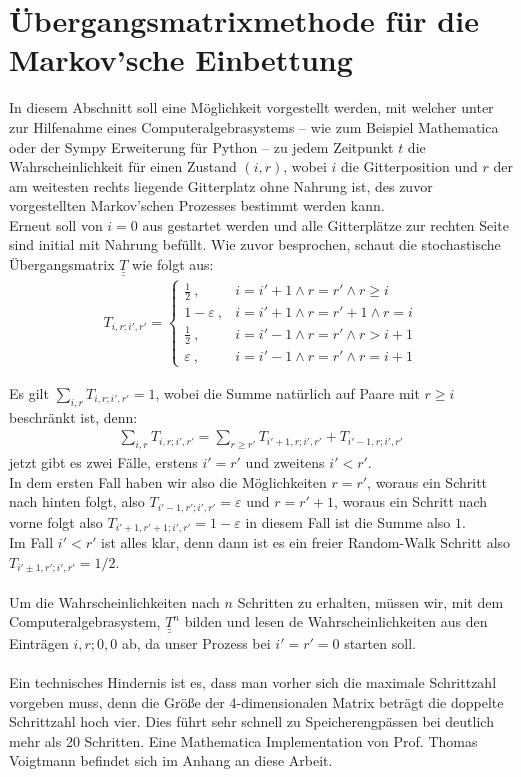 \documentclass[a4paper, 12pt]{report}
\begin{document}
\section{Übergangsmatrixmethode für die Markov'sche Einbettung}
In diesem Abschnitt soll eine Möglichkeit vorgestellt werden, mit welcher unter zur Hilfenahme eines Computeralgebrasystems -- wie zum Beispiel Mathematica oder der Sympy Erweiterung für Python -- zu jedem Zeitpunkt $t$ die Wahrscheinlichkeit für einen Zustand $(i,r)$, wobei $i$ die Gitterposition und $r$ der am weitesten rechts liegende Gitterplatz ohne Nahrung ist, des zuvor vorgestellten Markov'schen Prozesses bestimmt werden kann.
\\
Erneut soll von $i=0$ aus gestartet werden und alle Gitterplätze zur rechten Seite sind initial mit Nahrung befüllt. Wie zuvor besprochen, schaut die stochastische Übergangsmatrix $\underline{\underline{T}}$ wie folgt aus:
\begin{align}
T_{i,r;i',r'}=
\begin{cases}
\frac{1}{2}\ , & i=i'+1 \land r=r' \land r \geq i
\\
1-\varepsilon\ , & i=i'+1 \land r=r'+1 \land r=i
\\
\frac{1}{2}\ , & i=i'-1 \land r=r' \land r > i+1
\\
\varepsilon\ , & i=i'-1 \land r=r' \land r = i+1
\end{cases}
\end{align}

\noindent Es gilt $ \sum_{i,r} T_{i,r;i',r'}=1$, wobei die Summe natürlich auf Paare mit $r \geq i$ beschränkt ist, denn:
\begin{align}
\sum_{i,r} T_{i,r;i',r'}= \sum_{r\geq r'}T_{i'+1,r;i',r'} + T_{i'-1,r;i',r'}
\end{align}
jetzt gibt es zwei Fälle, erstens $i'=r'$ und zweitens $i'<r'$.
\\
In dem ersten Fall haben wir also die Möglichkeiten $r=r'$, woraus ein Schritt nach hinten folgt, also $T_{i'-1,r';i',r'}=\varepsilon$ und $r=r'+1$, woraus ein Schritt nach vorne folgt also $T_{i'+1,r'+1;i',r'}=1-\varepsilon$ in diesem Fall ist die Summe also $1$.
\\
Im Fall $i'<r'$ ist alles klar, denn dann ist es ein freier Random-Walk Schritt also $T_{i'\pm 1,r';i',r'}=1/2$.
\\
\\
Um die Wahrscheinlichkeiten nach $n$ Schritten zu erhalten, müssen wir, mit dem Computeralgebrasystem, $\underline{\underline{T}}^n$ bilden und lesen de Wahrscheinlichkeiten aus den Einträgen $i,r;0,0$ ab, da unser Prozess bei $i'=r'=0$ starten soll.
\\
\\
Ein technisches Hindernis ist es, dass man vorher sich die maximale Schrittzahl vorgeben muss, denn die Größe der 4-dimensionalen Matrix beträgt die doppelte Schrittzahl hoch vier. Dies führt sehr schnell zu Speicherengpässen bei deutlich mehr als 20 Schritten. Eine Mathematica Implementation von Prof. Thomas Voigtmann befindet sich im Anhang an diese Arbeit.
\end{document}
